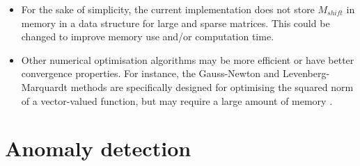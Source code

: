 \documentclass{article}
\begin{document}
\begin{itemize}
    \item For the sake of simplicity, the current implementation does not store $M_{shift}$ in memory in a data structure for large and sparse matrices. This could be changed to improve memory use and/or computation time.
    
    \item Other numerical optimisation algorithms may be more efficient or have better convergence properties. For instance, the Gauss-Newton and Levenberg-Marquardt methods are specifically designed for optimising the squared norm of a vector-valued function, but may require a large amount of memory \cite[Section 10.3]{Nocedal2006}.
    
\end{itemize}
    
\section{Anomaly detection}
\end{document}
